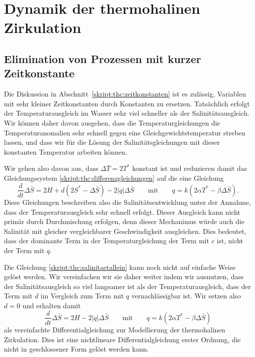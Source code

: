 %
%
%
\section{Dynamik der thermohalinen Zirkulation}

\subsection{Elimination von Prozessen mit kurzer Zeitkonstante}
Die Diskussion in Abschnitt~\ref{skript:thc:zeitkonstanten}
ist es zulässig, Variablen mit sehr kleiner Zeitkonstanten
durch Konstanten zu ersetzen.
Tatsächlich erfolgt der Temperaturausgleich im Wasser sehr viel
schneller als der Salinitätsausgleich.
Wir können daher davon ausgehen, dass die Temperaturgleichungen
die Temperaturanomalien sehr schnell gegen eine Gleichgewichtstemperatur
streben lassen, und dass wir für die Lösung der Salinitätsgleichungen
mit dieser konstanten Temperatur arbeiten können.

Wir gehen also davon aus, dass $\Delta\bar T=2T^*$ konstant ist und
reduzieren damit das Gleichungssystem
\eqref{skript:thc:differenzgleichungen}
auf die eine Gleichung
\begin{equation}
\frac{d}{dt}\Delta\bar S
=
2H + d(2S^* -\Delta\bar S) - 2|q|\Delta\bar S
\qquad\text{mit}\qquad
q=k(2\alpha T^* -\beta \Delta\bar S).
\label{skript:thc:salinitaetallein}
\end{equation}
Diese Gleichungen beschreiben also die Salinitätsentwicklung unter
der Annahme, dass der Temperaturausgleich sehr schnell erfolgt.
Dieser Ausgleich kann nicht primär durch Durchmischung erfolgen,
denn dieser Mechanimus würde auch die Salinität mit gleicher
vergleichbarer Geschwindigkeit ausgleichen.
Dies bedeutet, dass der dominante Term in der Temperaturgleichung
der Term mit $c$ ist, nicht der Term mit $q$.

Die Gleichung \eqref{skript:thc:salinitaetallein} kann noch nicht auf
einfache Weise gelöst werden.
Wir vereinfachen wir sie daher weiter indem wir ausnutzen, dass 
der Salinitätsausgleich so viel langsamer ist als der Temperaturausgleich,
dass der Term mit $d$ im Vergleich zum Term mit $q$ vernachlässigbar ist.
Wir setzen also $d=0$ und
erhalten damit 
\begin{equation}
\frac{d}{dt}\Delta\bar S
=
2H - 2|q|\Delta\bar S
\qquad\text{mit}\qquad
q=k(2\alpha T^* -\beta \Delta\bar S)
\label{skript:thc:qgleichung}
\end{equation}
als vereinfachte Differentialgleichung zur Modellierung der 
thermohalinen Zirkulation.
Dies ist eine nichtlineare Differentialgleichung erster Ordnung,
die nicht in geschlossener Form gelöst werden kann.

